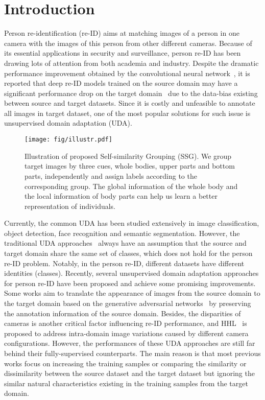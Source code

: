 \documentclass[10pt,twocolumn,letterpaper]{article}
\begin{document}
\section{Introduction}\label{intro}
Person re-identification (re-ID) aims at matching images of a person in one camera with the images of this person from other different cameras. Because of its essential applications in security and surveillance, person re-ID has been drawing lots of attention from both academia and industry. Despite the dramatic performance improvement obtained by the convolutional neural network~\cite{hermans2017defense,sun2017beyond,wang2018learning}, it is reported that deep re-ID models trained on the source domain may have a significant performance drop on the target domain~\cite{deng2018image,fan2018unsupervised} due to the data-bias existing between source and target datasets. Since it is costly and unfeasible to annotate all images in target dataset, one of the most popular solutions for such issue is unsupervised domain adaptation (UDA). 

\begin{figure}[t]
	\centering
	\texttt{[image: fig/illustr.pdf]}
	\caption{Illustration of proposed Self-similarity Grouping (SSG). We group target images by three cues, whole bodies, upper parts and bottom parts, independently and assign labels according to the corresponding group. The global information of the whole body and the local information of body parts can help us learn a better representation of individuals.}
	\label{fig:illus}
	\vspace{-3mm}
\end{figure}

Currently, the common UDA has been studied extensively in image classification, object detection, face recognition and semantic segmentation. However, the traditional UDA approaches~\cite{chen2018domain,chen2018road,motiian2017unified} always have an assumption that the source and target domain share the same set of classes, which does not hold for the person re-ID problem. Notably, in the person re-ID, different datasets have different identities (\ie classes). Recently, several unsupervised domain adaptation approaches for person re-ID have been proposed and achieve some promising improvements. Some works aim to translate the appearance of images from the source domain to the target domain based on the generative adversarial networks~\cite{deng2018image, wei2017person} by preserving the annotation information of the source domain. Besides, the disparities of cameras is another critical factor influencing re-ID performance, and HHL~\cite{zhong2018generalizing} is proposed to address intra-domain image variations caused by different camera configurations. However, the performances of these UDA approaches are still far behind their fully-supervised counterparts. The main reason is that most previous works focus on increasing the training samples or comparing the similarity or dissimilarity between the source dataset and the target dataset but ignoring the similar natural characteristics existing in the training samples from the target domain. 
\end{document}
